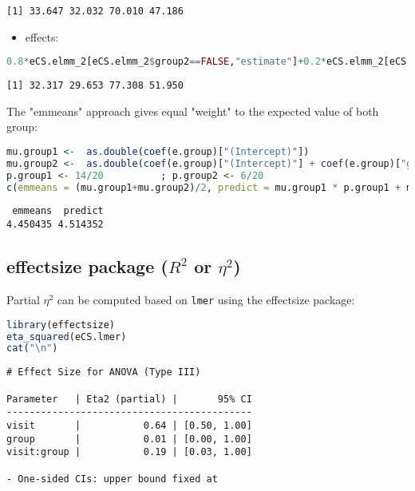 \documentclass[12pt]{article}
\begin{document}
\label{}
\begin{verbatim}
[1] 33.647 32.032 70.010 47.186
\end{verbatim}


\begin{itemize}
\item effects:
\end{itemize}
\begin{lstlisting}[language=r,numbers=none]
0.8*eCS.elmm_2[eCS.elmm_2$group2==FALSE,"estimate"]+0.2*eCS.elmm_2[eCS.elmm_2$group2==TRUE,"estimate"]
\end{lstlisting}

\label{}
\begin{verbatim}
[1] 32.317 29.653 77.308 51.950
\end{verbatim}


The "emmeans" approach gives equal "weight" to the expected value of
both group:
\begin{lstlisting}[language=r,numbers=none]
mu.group1 <-  as.double(coef(e.group)["(Intercept)"])
mu.group2 <-  as.double(coef(e.group)["(Intercept)"] + coef(e.group)["group2TRUE"])
p.group1 <- 14/20          ; p.group2 <- 6/20
c(emmeans = (mu.group1+mu.group2)/2, predict = mu.group1 * p.group1 + mu.group2 * p.group2)
\end{lstlisting}

\label{}
\begin{verbatim}
 emmeans  predict 
4.450435 4.514352
\end{verbatim}


\clearpage
\subsection{effectsize package (\(R^2\) or \(\eta^2\))}
\label{sec:org99dcd39}

Partial \(\eta^2\) can be computed based on \texttt{lmer} using the effectsize package:
\begin{lstlisting}[language=r,numbers=none]
library(effectsize)
eta_squared(eCS.lmer)
cat("\n")
\end{lstlisting}

\label{}
\begin{verbatim}
# Effect Size for ANOVA (Type III)

Parameter   | Eta2 (partial) |       95% CI
-------------------------------------------
visit       |           0.64 | [0.50, 1.00]
group       |           0.01 | [0.00, 1.00]
visit:group |           0.19 | [0.03, 1.00]

- One-sided CIs: upper bound fixed at
\end{verbatim}
\end{document}
